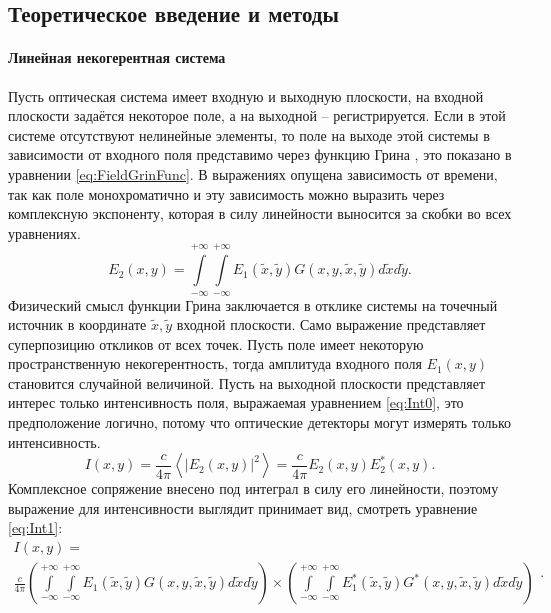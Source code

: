 \subsection{Теоретическое введение и методы}

\paragraph{Линейная некогерентная система}
Пусть оптическая система имеет входную и выходную плоскости, на входной плоскости задаётся некоторое поле, а на выходной -- регистрируется. Если в этой системе отсутствуют нелинейные элементы, то поле на выходе этой системы в зависимости от входного поля представимо через функцию Грина \cite{MMF}, это показано в уравнении \ref{eq:FieldGrinFunc}. В выражениях опущена зависимость от времени, так как поле монохроматично и эту зависимость можно выразить через комплексную экспоненту, которая в силу линейности выносится за скобки во всех уравнениях.
\begin{equation}\label{eq:FieldGrinFunc}
	E_2(x,y) = \int\limits_{-\infty}^{+\infty}\int\limits_{-\infty}^{+\infty}E_1(\tilde{x},\tilde{y})G(x,y,\tilde{x},\tilde{y})d\tilde{x}d\tilde{y}.
\end{equation}
Физический смысл функции Грина заключается в отклике системы на точечный источник в координате $\tilde{x},\tilde{y}$ входной плоскости. Само выражение представляет суперпозицию откликов от всех точек. Пусть поле имеет некоторую пространственную некогерентность, тогда амплитуда входного поля $E_1(x,y)$ становится случайной величиной. Пусть на выходной плоскости представляет интерес только интенсивность поля, выражаемая уравнением \ref{eq:Int0}, это предположение логично, потому что оптические детекторы могут измерять только интенсивность.
\begin{equation}\label{eq:Int0}
	I(x,y) = \frac{c}{4\pi}\left<\left|E_2(x,y)\right|^2\right> = \frac{c}{4\pi}E_2(x,y)E_2^*(x,y).
\end{equation}
Комплексное сопряжение внесено под интеграл в силу его линейности, поэтому выражение для интенсивности выглядит принимает вид, смотреть уравнение \ref{eq:Int1}:
\begin{equation}\label{eq:Int1}
	\begin{gathered}
		I(x,y) = \\ \frac{c}{4\pi}
		\left(\int\limits_{-\infty}^{+\infty}\int\limits_{-\infty}^{+\infty}E_1(\tilde{x},\tilde{y})G(x,y,\tilde{x},\tilde{y})d\tilde{x}d\tilde{y}\right)
		\times
		\left(\int\limits_{-\infty}^{+\infty}\int\limits_{-\infty}^{+\infty}E_1^*(\tilde{x},\tilde{y})G^*(x,y,\tilde{x},\tilde{y})d\tilde{x}d\tilde{y}\right)
	\end{gathered}.
\end{equation}
